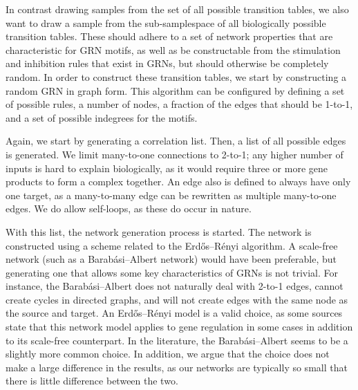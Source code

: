 \documentclass[../main.tex]{subfiles}
\begin{document}
In contrast drawing samples from the set of all possible transition tables, we also want to draw a sample from the sub-samplespace of all biologically possible transition tables.
These should adhere to a set of network properties that are characteristic for GRN motifs, as well as be constructable from the stimulation and inhibition rules that exist in GRNs, but should otherwise be completely random.
In order to construct these transition tables, we start by constructing a random GRN in graph form.
This algorithm can be configured by defining a set of possible rules, a number of nodes, a fraction of the edges that should be 1-to-1, and a set of possible indegrees for the motifs.

Again, we start by generating a correlation list.
Then, a list of all possible edges is generated.
We limit many-to-one connections to 2-to-1; any higher number of inputs is hard to explain biologically, as it would require three or more gene products to form a complex together.
An edge also is defined to always have only one target, as a many-to-many edge can be rewritten as multiple many-to-one edges.
We do allow self-loops, as these do occur in nature.

With this list, the network generation process is started.
The network is constructed using a scheme related to the Erdős–Rényi algorithm.
A scale-free network (such as a Barabási–Albert network) would have been preferable, but generating one that allows some key characteristics of GRNs is not trivial.
For instance, the Barabási–Albert does not naturally deal with 2-to-1 edges, cannot create cycles in directed graphs, and will not create edges with the same node as the source and target.
An Erdős–Rényi model is a valid choice, as some sources state that this network model applies to gene regulation in some cases in addition to its scale-free counterpart.
In the literature, the Barabási–Albert seems to be a slightly more common choice.
In addition, we argue that the choice does not make a large difference in the results, as our networks are typically so small that there is little difference between the two.
\end{document}
